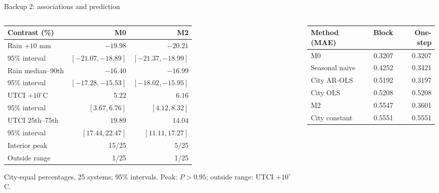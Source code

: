 \documentclass[aspectratio=169,11pt]{beamer}
\begin{document}
\begin{frame}{Backup 2: associations and prediction}
  \footnotesize
  \renewcommand{\arraystretch}{0.85}
  \begin{columns}[T,onlytextwidth]
    \begin{column}{0.55\textwidth}
      \centering
      \begin{tabular}{@{}lrr@{}}
        \toprule
        Contrast (\%) & M0 & M2 \\
        \midrule
        Rain $+10$ mm & $-19.98$ & $-20.21$ \\
        95\% interval & $[-21.07,-18.89]$ & $[-21.37,-18.99]$ \\
        Rain median--90th & $-16.40$ & $-16.99$ \\
        95\% interval & $[-17.28,-15.53]$ & $[-18.02,-15.95]$ \\
        UTCI $+10^\circ$C & $5.22$ & $6.16$ \\
        95\% interval & $[3.67,6.76]$ & $[4.12,8.32]$ \\
        UTCI 25th--75th & $19.89$ & $14.04$ \\
        95\% interval & $[17.44,22.47]$ & $[11.11,17.27]$ \\
        Interior peak & 15/25 & 5/25 \\
        Outside range & 1/25 & 1/25 \\
        \bottomrule
      \end{tabular}
      \par\vspace{0.04cm}
      City-equal percentages, 25 systems; 95\% intervals.
      Peak: $P>0.95$; outside range: UTCI $+10^\circ$C.
    \end{column}
    \begin{column}{0.43\textwidth}
      \centering
      \begin{tabular}{@{}lrr@{}}
        \toprule
        Method (MAE) & Block & One-step \\
        \midrule
        M0 & 0.3207 & 0.3207 \\
        Seasonal naive & 0.4252 & 0.3421 \\
        City AR-OLS & 0.5192 & 0.3197 \\
        City OLS & 0.5208 & 0.5208 \\
        M2 & 0.5547 & 0.3601 \\
        City constant & 0.5551 & 0.5551 \\
        \bottomrule
      \end{tabular}

\end{column}
\end{columns}
\end{frame}
\end{document}

